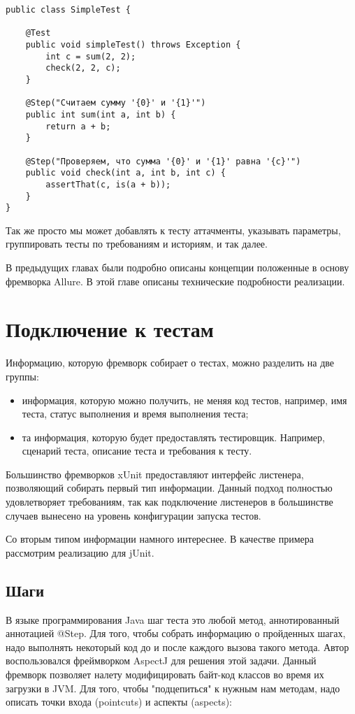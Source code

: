 \begin{lstlisting}
public class SimpleTest {

    @Test
    public void simpleTest() throws Exception {
        int c = sum(2, 2);
        check(2, 2, c);
    }
    
    @Step("Считаем сумму '{0}' и '{1}'")
    public int sum(int a, int b) {
		return a + b;
	}    
    
    @Step("Проверяем, что сумма '{0}' и '{1}' равна '{c}'")
    public void check(int a, int b, int c) {
    	assertThat(c, is(a + b));	
    }
}
\end{lstlisting}

Так же просто мы может добавлять к тесту аттачменты, указывать параметры, группировать тесты по требованиям и историям, и так далее.


В предыдущих главах были подробно описаны концепции положенные в основу фремворка Allure. В этой главе
описаны технические подробности реализации.

\section{Подключение к тестам}

Информацию, которую фремворк собирает о тестах, можно разделить на две группы:

\begin{itemize}
\item информация, которую можно получить, не меняя код тестов, например, имя теста, статус выполнения и время выполнения теста;
\item та информация, которую будет предоставлять тестировщик. Например, сценарий теста, описание теста и требования к тесту.
\end{itemize}

Большинство фремворков xUnit предоставляют интерфейс листенера, позволяющий собирать первый тип информации. Данный подход полностью удовлетворяет требованиям, так как подключение листенеров в большинстве случаев вынесено на уровень конфигурации запуска тестов.

Со вторым типом информации намного интереснее. В качестве примера рассмотрим реализацию для jUnit.

\subsection{Шаги}

В языке программирования Java шаг теста это любой метод, аннотированный аннотацией @Step. Для того, чтобы собрать информацию о пройденных шагах, надо выполнять некоторый код до и после каждого вызова такого метода. Автор воспользовался фреймворком AspectJ для решения этой задачи. Данный фремворк позволяет налету модифицировать байт-код классов во время их загрузки в JVM. Для того, чтобы "подцепиться" к нужным нам методам, надо описать точки входа (pointcuts) и аспекты (aspects): 

